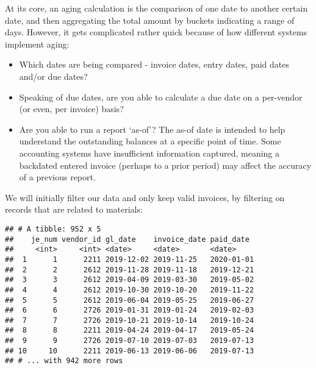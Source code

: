 \documentclass[
]{book}
\newenvironment{Shaded}{\begin{snugshade}}{\end{snugshade}}
\newcommand{\CommentTok}[1]{\textcolor[rgb]{0.56,0.35,0.01}{\textit{#1}}}
\newcommand{\KeywordTok}[1]{\textcolor[rgb]{0.13,0.29,0.53}{\textbf{#1}}}
\newcommand{\NormalTok}[1]{#1}
\newcommand{\OperatorTok}[1]{\textcolor[rgb]{0.81,0.36,0.00}{\textbf{#1}}}
\newcommand{\StringTok}[1]{\textcolor[rgb]{0.31,0.60,0.02}{#1}}
\providecommand{\tightlist}{%
  \setlength{\itemsep}{0pt}\setlength{\parskip}{0pt}}
\begin{document}
At its core, an aging calculation is the comparison of one date to another certain date, and then aggregating the total amount by buckets indicating a range of days. However, it gets complicated rather quick because of how different systems implement aging:

\begin{itemize}
\tightlist
\item
  Which dates are being compared - invoice dates, entry dates, paid dates and/or due dates?
\item
  Speaking of due dates, are you able to calculate a due date on a per-vendor (or even, per invoice) basis?
\item
  Are you able to run a report `as-of'? The as-of date is intended to help understand the outstanding balances at a specific point of time. Some accounting systems have insufficient information captured, meaning a backdated entered invoice (perhaps to a prior period) may affect the accuracy of a previous report.
\end{itemize}

We will initially filter our data and only keep valid invoices, by filtering on records that are related to materials:

\begin{Shaded}
\end{Shaded}

\begin{verbatim}
## # A tibble: 952 x 5
##    je_num vendor_id gl_date    invoice_date paid_date 
##     <int>     <int> <date>     <date>       <date>    
##  1      1      2211 2019-12-02 2019-11-25   2020-01-01
##  2      2      2612 2019-11-28 2019-11-18   2019-12-21
##  3      3      2612 2019-04-09 2019-03-30   2019-05-02
##  4      4      2612 2019-10-30 2019-10-20   2019-11-22
##  5      5      2612 2019-06-04 2019-05-25   2019-06-27
##  6      6      2726 2019-01-31 2019-01-24   2019-02-03
##  7      7      2726 2019-10-21 2019-10-14   2019-10-24
##  8      8      2211 2019-04-24 2019-04-17   2019-05-24
##  9      9      2726 2019-07-10 2019-07-03   2019-07-13
## 10     10      2211 2019-06-13 2019-06-06   2019-07-13
## # ... with 942 more rows
\end{verbatim}
\end{document}
